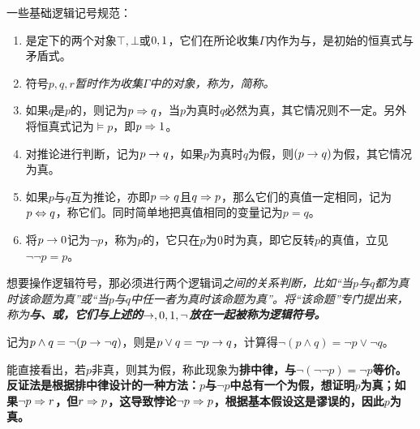 \begin{definition}
	
	一些基础逻辑记号规范：
	
	\begin{enumerate}
		
		\item {}是定下的两个对象$\top,\bot$或$\mathrm{0},\mathrm{1}$，它们在所论收集$\Gamma$内作为与，是初始的\rm{恒真式}与\rm{矛盾式}。
		
		\item 符号$p,q,r$\it{暂时}作为收集$\Gamma$中的对象，称为，简称。
		
		\item 如果$q$是$p$的，则记为$p\Rightarrow q$，当$p$为真时$q$必然为真，其它情况则不一定。另外将恒真式记为$\vDash p$，即$p\Rightarrow \mathrm{1}$。
		
		\item 对推论进行判断，记为$p\rightarrow q$，如果$p$为真时$q$为假，则$(p\rightarrow q)$为假，其它情况为真。
		
		\item 如果$p$与$q$互为推论，亦即$p\Rightarrow q$且$q\Rightarrow p$，那么它们的真值一定相同，记为$p\Leftrightarrow q$，称它们。同时简单地把真值相同的变量记为$p=q$。
		
		\item 将$p\rightarrow \mathrm{0}$记为$\neg p$，称为$p$的，它只在$p$为$\mathrm{0}$时为真，即它反转$p$的真值，立见$\neg \neg p = p$。
		
	\end{enumerate}
	
\end{definition}

想要操作逻辑符号，那必须进行两个逻辑词\it{之间}的关系判断，比如“当$p$与$q$都为真时该命题为真”或“当$p$与$q$中任一者为真时该命题为真”。将“该命题”专门提出来，称为\bf{与}、\bf{或}，它们与上述的$\rightarrow, \mathrm{0}, \mathrm{1}, \neg$放在一起被称为\bf{逻辑符号}。

\begin{definition}[De Morgan律与合/析取]
	
	记为$p\wedge q = \neg(p\rightarrow \neg q)$，则是$p\vee q = \neg p\rightarrow q$，计算得$\neg(p\wedge q) = \neg p \vee \neg q$。
	
\end{definition}

能直接看出，若$p$非真，则其为假，称此现象为\bf{排中律}，与$\neg(\neg\neg p) = \neg p$等价。\bf{反证法}是根据排中律设计的一种方法：$p$与$\neg p$中总有一个为假，想证明$p$为真；如果$\neg p\Rightarrow r$，但$r\Rightarrow p$，这导致\bf{悖论}$\neg p\Rightarrow p$，根据基本假设这是谬误的，因此$p$为真。

